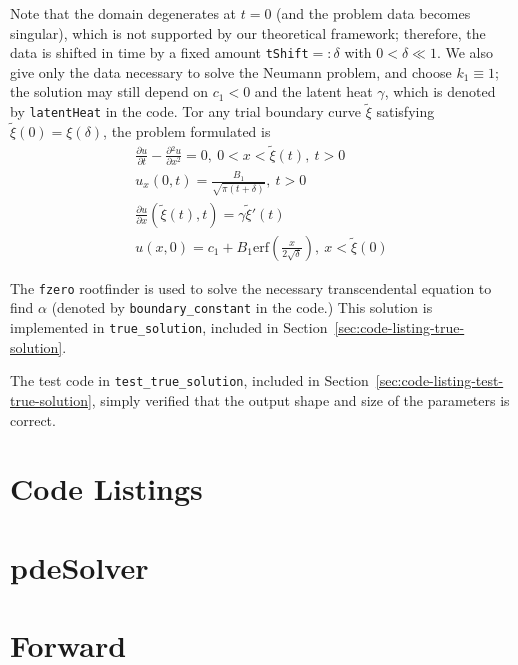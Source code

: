\documentclass[letterpaper, 10pt]{amsart}
\theoremstyle{definition}
\theoremstyle{remark}
\newcommand{\D}[2]{\frac{\partial{} #1}{\partial{} #2}}
\begin{document}
Note that the domain degenerates at $t=0$ (and the problem data becomes
singular), which is not supported by our theoretical framework; therefore, the
data is shifted in time by a fixed amount \verb+tShift+$=: \delta$ with
$0<\delta \ll 1$.
We also give only the data necessary to solve the Neumann problem, and choose
$k_1 \equiv 1$; the solution may still depend on $c_1<0$ and the latent heat
$\gamma$, which is denoted by \verb+latentHeat+ in the code.
Tor any trial boundary curve $\tilde{\xi}$ satisfying $\tilde{\xi}(0)
= \xi(\delta)$, the problem formulated is
\begin{gather}
  \D{u}{t} - \D{^2 u}{x^2} = 0,~0<x<\tilde{\xi}(t),~t>0
  \\
  u_x(0,t) = \frac{B_1}{\sqrt{\pi (t + \delta)}},~t>0
  \\
  \D{u}{x}(\tilde{\xi}(t),t) = \gamma \tilde{\xi}'(t)
  \\
  u(x,0) = c_1 + B_1 \mathrm{erf}\left( \frac{x}{2 \sqrt{\delta}}\right),~x<\tilde{\xi}(0)
\end{gather}

The \verb+fzero+ rootfinder is used to solve the necessary transcendental
equation to find $\alpha$ (denoted by \verb+boundary_constant+ in the code.)
This solution is implemented in \verb+true_solution+, included in
Section~\ref{sec:code-listing-true-solution}.

The test code in \verb+test_true_solution+, included in Section~\ref{sec:code-listing-test-true-solution}, simply verified that the output shape and size of the parameters is correct.


\appendix
\section*{Code Listings}

\section{pdeSolver}\label{sec:code-listing-pdeSolver}
{\small

}

\section{Forward}\label{sec:code-listing-forward}
{\small

}
\end{document}
